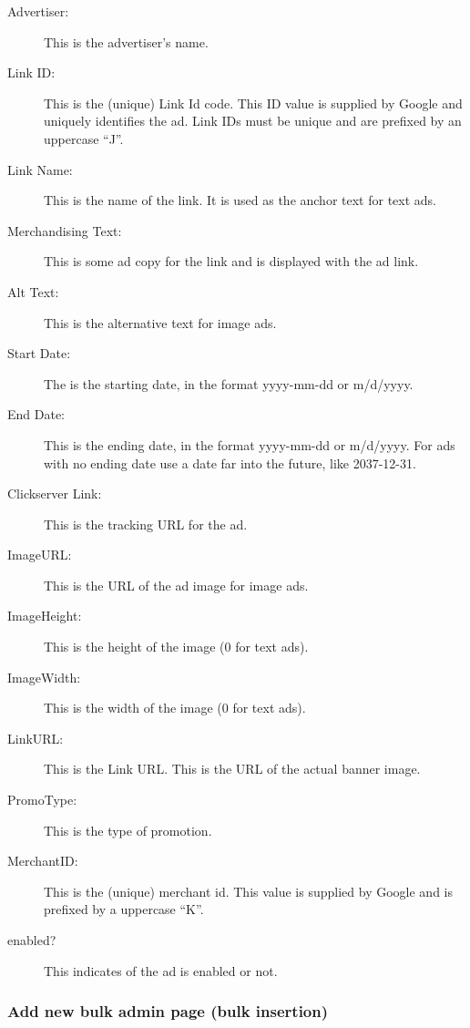 \documentclass[letterpaper]{article}
\begin{document}
\begin{description}
  \item[Advertiser:] This is the advertiser's name.
  \item[Link ID:] This is the (unique) Link Id code. This ID value is
supplied by Google and uniquely identifies the ad.  Link IDs must be
unique and are prefixed by an uppercase ``J''.
  \item[Link Name:] This is the name of the link.  It is used as the
anchor text for text ads.
  \item[Merchandising Text:] This is some ad copy for the
link and is displayed with the ad link.
  \item[Alt Text:] This is the alternative text for image
ads.
  \item[Start Date:] The is the starting date, in the format yyyy-mm-dd
or m/d/yyyy. 
  \item[End Date:] This is the ending date, in the format yyyy-mm-dd or
m/d/yyyy. For ads with no ending date use a date far into the future,
like 2037-12-31.
  \item[Clickserver Link:] This is the tracking URL for the ad. 
  \item[ImageURL:] This is the URL of the ad image for image ads. 
  \item[ImageHeight:] This is the height of the image (0 for text ads). 
  \item[ImageWidth:] This is the width of the image (0 for text ads). 
  \item[LinkURL:] This is the Link URL.  This is the URL of the actual
banner image.
  \item[PromoType:] This is the type of promotion.
  \item[MerchantID:] This is the (unique) merchant id.  This value is
supplied by Google and is prefixed by a uppercase ``K''.
  \item[enabled?] This indicates of the ad is enabled or
not. 
\end{description}

\subsubsection{Add new bulk admin page (bulk insertion)}
\label{sect:addbulk}
\end{document}
